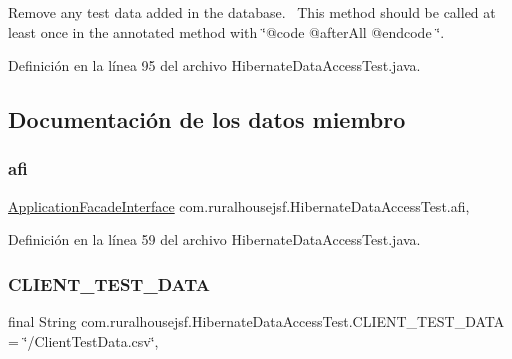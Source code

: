Remove any test data added in the database.~\newline
 This method should be called at least once in the annotated method with \char`\"{}@code @after\+All @endcode \char`\"{}. 

Definición en la línea 95 del archivo Hibernate\+Data\+Access\+Test.\+java.



\subsection{Documentación de los datos miembro}
\mbox{\label{classcom_1_1ruralhousejsf_1_1_hibernate_data_access_test_a80a8ded7f2e12687541427d97fdbe29a}} 
\subsubsection{\texorpdfstring{afi}{afi}}
{\footnotesize\ttfamily \mbox{\hyperlink{interfacecom_1_1ruralhousejsf_1_1business_logic_1_1_application_facade_interface}{Application\+Facade\+Interface}} com.\+ruralhousejsf.\+Hibernate\+Data\+Access\+Test.\+afi\hspace{0.3cm}{\ttfamily [static]}, {\ttfamily [package]}}



Definición en la línea 59 del archivo Hibernate\+Data\+Access\+Test.\+java.

\mbox{\label{classcom_1_1ruralhousejsf_1_1_hibernate_data_access_test_ae42994f5a5d8bf916a38b64cda2788b1}} 
\subsubsection{\texorpdfstring{CLIENT\_TEST\_DATA}{CLIENT\_TEST\_DATA}}
{\footnotesize\ttfamily final String com.\+ruralhousejsf.\+Hibernate\+Data\+Access\+Test.\+C\+L\+I\+E\+N\+T\+\_\+\+T\+E\+S\+T\+\_\+\+D\+A\+TA = \char`\"{}/Client\+Test\+Data.\+csv\char`\"{}\hspace{0.3cm}{\ttfamily [static]}, {\ttfamily [package]}}



